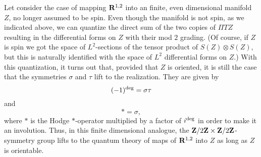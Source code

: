 Let consider the case of mapping ${\bf R}^{1,2}$ into an finite, even
dimensional manifold $Z$, no longer assumed to be spin.
Even though the manifold is not spin, as we indicated above, we can
quantize the direct sum of the two copies 
of $\Pi TZ$ resulting in the differential forms on $Z$ with their
mod $2$ grading. (Of course, if $Z$ is spin we got the space of
$L^2$-sections of the tensor product of $S(Z)\otimes S(Z)$, but this
is naturally identified with the space of $L^2$ differential forms on $Z$.)
With this quantization, it turns out that, provided that $Z$ is
oriented, it is still the case that  the symmetries $\sigma$ and
$\tau$ lift to the realization.  They are given by 
$$(-1)^{\rm deg}=\sigma\tau$$
and 
$$*=\sigma,$$
where $*$ is the Hodge $*$-operator multiplied by a factor of $i^{\rm
deg}$ in order to make it an involution.
Thus, in this finite dimensional analogue, the ${\bf Z}/2{\bf Z}\times
{\bf Z}/2{\bf Z}$-symmetry group lifts to the quantum theory of maps
of ${\bf R}^{1,2}$ into $Z$ as long as $Z$ is orientable.

